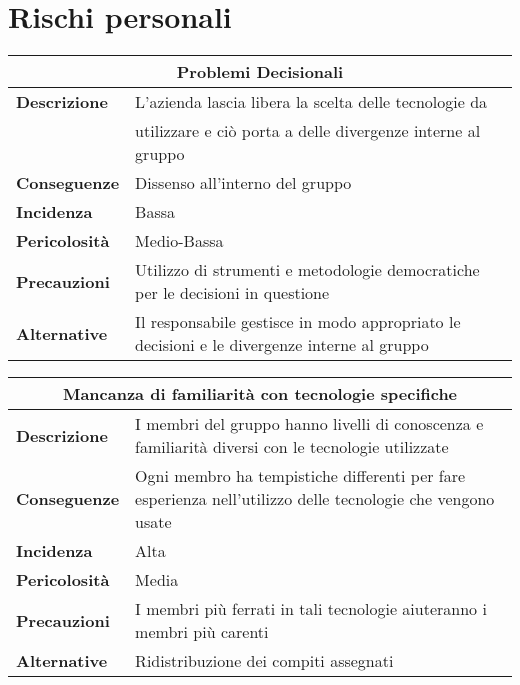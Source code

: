 \section{Rischi personali}

\begin{center}
    \begin{tabularx}{0.8\linewidth}{l|X}
        \multicolumn{2}{c}{\textbf{Problemi Decisionali}}                                                       \\
        \hline{\textbf{Descrizione}}    & L'azienda lascia libera la scelta delle tecnologie da                 \\ 
                                        & utilizzare e ciò porta a delle divergenze interne al gruppo           \\ 
        \textbf{Conseguenze}            & Dissenso all'interno del gruppo\\
        \textbf{Incidenza}              & Bassa\\
        \textbf{Pericolosità}           &Medio-Bassa\\
        \textbf{Precauzioni}            & Utilizzo di strumenti e metodologie democratiche per le decisioni in questione\\
        \textbf{Alternative}            & Il responsabile gestisce in modo appropriato le decisioni e le divergenze interne al gruppo\\     
    \end{tabularx}
\end{center}

\begin{center}
    \begin{tabularx}{0.8\linewidth}{l|X}
        \multicolumn{2}{c}{\textbf{Mancanza di familiarità con tecnologie specifiche}}                                  \\
        \hline{\textbf{Descrizione}}    & I membri del gruppo hanno livelli di conoscenza e familiarità diversi con le tecnologie utilizzate\\
        \textbf{Conseguenze}            & Ogni membro ha tempistiche differenti per fare esperienza nell'utilizzo delle tecnologie che vengono usate\\
        \textbf{Incidenza}              &Alta\\
        \textbf{Pericolosità}           &Media\\
        \textbf{Precauzioni}            & I membri più ferrati in tali tecnologie aiuteranno i membri più carenti\\
        \textbf{Alternative}            & Ridistribuzione dei compiti assegnati\\ 
    \end{tabularx}
\end{center}


